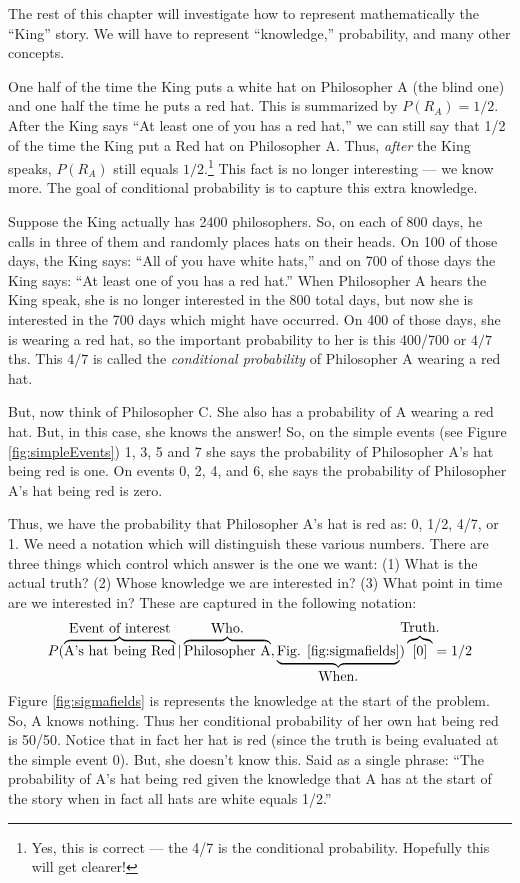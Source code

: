 \documentclass[14pt]{extarticle}
\begin{document}
The rest of this chapter will investigate how to represent
mathematically the ``King'' story.  We will have to represent
``knowledge,'' probability, and many other concepts.

\vspace{4ex}


One half of the time the King puts a white hat on Philosopher A (the
blind one) and one half the time he puts a red hat.  This is
summarized by $P(R_A) = 1/2$.  After the King says ``At least one of you
has a red hat,'' we can still say that 1/2 of the time the King put a
Red hat on Philosopher A.  Thus, {\em after} the King speaks, $P(R_A)$
still equals $1/2$.\footnote{Yes, this is correct --- the 4/7 is the
  conditional probability.  Hopefully this will get clearer!}
  This fact is no longer interesting --- we know more.
The goal of conditional probability is to capture this extra
knowledge. 

Suppose the King actually has 2400 philosophers.  So, on each of 800
days, he calls in three of them and randomly places hats on their
heads.  On 100 of those days, the King says: ``All of you have white
hats,'' and on 700 of those days the King says: ``At least one of you
has a red hat.''  When Philosopher A hears the King speak, she is no
longer interested in the 800 total days, but now she is interested in
the 700 days which might have occurred.  On 400 of those days, she is
wearing a red hat, so the important probability to her is this 400/700
or $4/7$ths.  This $4/7$ is called the {\it conditional probability} of
Philosopher A wearing a red hat.

But, now think of Philosopher C.  She also has a probability of A
wearing a red hat.  But, in this case, she knows the answer!  So, on
the simple events (see Figure \ref{fig:simpleEvents}) 1, 3, 5 and 7
she says the probability of Philosopher A's hat being red is one.  On
events 0, 2, 4, and 6, she says the probability of Philosopher A's hat
being red is zero.

Thus, we have the probability that Philosopher A's hat is red as: 0,
1/2, 4/7, or 1.  We need a notation which will distinguish these
various numbers.  There are three things which control which answer is
the one we want: (1) What is the actual truth?  (2) Whose knowledge we
are interested in?  (3) What point in time are we interested in?
These are captured in the following notation:
\begin{displaymath}
  P(\overbrace{\hbox{A's hat being Red}}^{\hbox{Event of interest}} |
  \overbrace{\hbox{Philosopher
      A}}^{\hbox{Who.}},\underbrace{\hbox{Fig.
      \ref{fig:sigmafields}}}_{\hbox{When.}})
  \overbrace{[0]}^{\makebox[0pt][c]{\hbox{Truth.}}} = 1/2
\end{displaymath}
Figure \ref{fig:sigmafields} is represents the knowledge at the start
of the problem.  So, A knows nothing.  Thus her conditional
probability of her own hat being red is 50/50.  Notice that in fact
her hat is red (since the truth is being evaluated at the simple event
0).  But, she doesn't know this.  Said as a single phrase: ``The
probability of A's hat being red given the knowledge that A has at the
start of the story when in fact all hats are white equals 1/2.''
\end{document}
